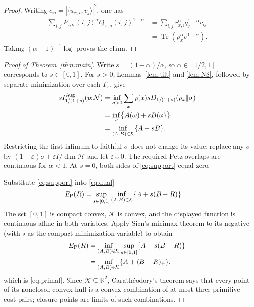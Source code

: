 \documentclass[10pt]{article}
\newcommand{\Tr}{\operatorname{Tr}}
\newcommand{\cH}{\mathcal H}
\newcommand{\cK}{\mathcal K}
\newcommand{\cN}{\mathcal N}
\newcommand{\Aug}{\mathrm{Aug}}
\begin{document}
\begin{proof}
Writing $c_{ij}=|\langle u_{x,i},v_j\rangle|^2$, one has
\begin{align*}
 \sum_{i,j}P_{x,\sigma}(i,j)^\alpha
 Q_{x,\sigma}(i,j)^{1-\alpha}
 &=\sum_{i,j}r_{x,i}^\alpha q_j^{1-\alpha}c_{ij}\\
 &=\Tr(\rho_x^\alpha\sigma^{1-\alpha}).
\end{align*}
Taking $(\alpha-1)^{-1}\log$ proves the claim.
\end{proof}

\begin{proof}[Proof of Theorem~\ref{thm:main}]
Write $s=(1-\alpha)/\alpha$, so $\alpha\in[1/2,1]$ corresponds to
$s\in[0,1]$. For $s>0$, Lemmas~\ref{lem:tilt} and \ref{lem:NS}, followed by
separate minimization over each $T_x$, give
\begin{align}\label{eq:support}
 sI_{1/(1+s)}^{\Aug}(p;\cN)
 &=\inf_{\sigma>0}\sum_xp(x)
     sD_{1/(1+s)}(\rho_x\Vert\sigma)\notag\\
 &=\inf_{\omega}\bigl\{A(\omega)+sB(\omega)\bigr\}\notag\\
 &=\inf_{(A,B)\in\cK}\{A+sB\}.
\end{align}
Restricting the first infimum to faithful $\sigma$ does not change its value:
replace any $\sigma$ by
$(1-\varepsilon)\sigma+\varepsilon I/\dim\cH$ and let
$\varepsilon\downarrow0$. The required Petz overlaps are continuous for
$\alpha<1$. At $s=0$, both sides of \eqref{eq:support} equal zero.

Substitute \eqref{eq:support} into \eqref{eq:dual}:
\begin{align*}
 E_{\rm P}(R)
 &=\sup_{s\in[0,1]}\inf_{(A,B)\in\cK}
   \{A+s(B-R)\}.
\end{align*}
The set $[0,1]$ is compact convex, $\cK$ is convex, and the displayed
function is continuous affine in both variables. Apply Sion's minimax theorem
to its negative (with $s$ as the compact minimization variable) to obtain
\begin{align*}
 E_{\rm P}(R)
 &=\inf_{(A,B)\in\cK}\sup_{s\in[0,1]}
   \{A+s(B-R)\}\\
 &=\inf_{(A,B)\in\cK}\{A+(B-R)_+\},
\end{align*}
which is \eqref{eq:primal}. Since $\cK\subseteq\mathbb R^2$, Carath\'eodory's
theorem says that every point of its nonclosed convex hull is a convex
combination of at most three primitive cost pairs; closure points are limits
of such combinations.


\end{proof}
\end{document}

